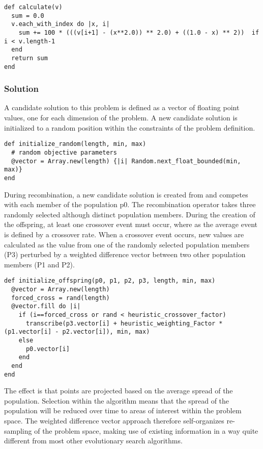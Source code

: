 \begin{lstlisting}
def calculate(v)
  sum = 0.0
  v.each_with_index do |x, i|
    sum += 100 * (((v[i+1] - (x**2.0)) ** 2.0) + ((1.0 - x) ** 2))  if i < v.length-1
  end
  return sum
end
\end{lstlisting}

\subsubsection{Solution}
A candidate solution to this problem is defined as a vector of floating point values, one for each dimension of the problem. A new candidate solution is initialized to a random position within the constraints of the problem definition.

\begin{lstlisting}
def initialize_random(length, min, max)
  # random objective parameters
  @vector = Array.new(length) {|i| Random.next_float_bounded(min, max)}
end
\end{lstlisting}

During recombination, a new candidate solution is created from and competes with each member of the population p0. The recombination operator takes three randomly selected although distinct population members. During the creation of the offspring, at least one crossover event must occur, where as the average event is defined by a crossover rate. When a crossover event occurs, new values are calculated as the value from one of the randomly selected population members (P3) perturbed by a weighted difference vector between two other population members (P1 and P2). 

\begin{lstlisting}
def initialize_offspring(p0, p1, p2, p3, length, min, max)
  @vector = Array.new(length)
  forced_cross = rand(length)
  @vector.fill do |i|
    if (i==forced_cross or rand < heuristic_crossover_factor)
      transcribe(p3.vector[i] + heuristic_weighting_Factor * (p1.vector[i] - p2.vector[i]), min, max)
    else
      p0.vector[i]
    end
  end
end
\end{lstlisting}

The effect is that points are projected based on the average spread of the population. Selection within the algorithm means that the spread of the population will be reduced over time to areas of interest within the problem space. The weighted difference vector approach therefore self-organizes re-sampling of the problem space, making use of existing information in a way quite different from most other evolutionary search algorithms.

